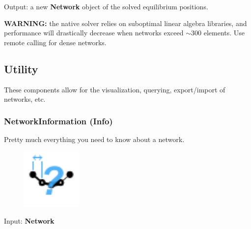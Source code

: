 Output: a new \textbf{Network} object of the solved equilibrium positions.

{\color{kpink} \textbf{WARNING:} the native solver relies on suboptimal linear algebra libraries, and performance will drastically decrease when networks exceed $\sim$300 elements. Use remote calling for dense networks.}


\subsection{Utility}\label{Utility}
These components allow for the visualization, querying, export/import of networks, etc.

\subsubsection{NetworkInformation (Info)}\label{Info}
Pretty much everything you need to know about a network.

\begin{figure}[h]
    \centering
    \includegraphics[width = 3cm]{Figures/Information}
\end{figure}

Input: \textbf{Network} \\


